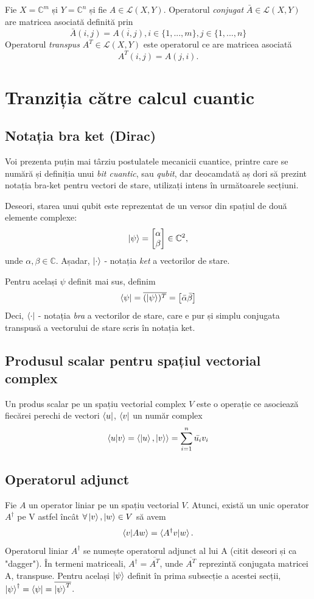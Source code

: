 Fie $X = \mathbb{C}^m$ și $Y = \mathbb{C}^n$ și fie $A \in \mathcal{L}(X,Y)$.
Operatorul \textit{conjugat} $\bar{A} \in \mathcal{L}(X, Y)$ are matricea asociată definită prin
\[
\bar{A}(i,j) = \overline{A(i,j)}, i \in \{1, ..., m\}, j \in \{1, ..., n\}
\]
Operatorul \textit{transpus} $A^T \in \mathcal{L}(X, Y)$ este operatorul ce are matricea asociată
\[
A^T(i,j) = A(j,i).
\]


\section{Tranziția către calcul cuantic}
\subsection{Notația bra ket (Dirac)}

Voi prezenta puțin mai târziu postulatele mecanicii cuantice, printre care se numără și definiția unui \textit{bit cuantic}, sau \textit{qubit}, dar deocamdată aș dori să prezint notația bra-ket pentru vectori de stare, utilizați intens în următoarele secțiuni. 

Deseori, starea unui qubit este reprezentat de un versor din spațiul de două elemente complexe:
\[
\ket{\psi} = \begin{bmatrix} \alpha \\ \beta \end{bmatrix} \in \mathbb{C}^2,
\]
unde $\alpha, \beta \in \mathbb{C}$. Așadar, $\ket{\cdot}$ - notația \textit{ket} a vectorilor de stare.

Pentru același $\psi$ definit mai sus, definim 
\[
\bra{\psi} = \overline{(\ket{\psi})^T} = \begin{bmatrix}
\bar{\alpha} \bar{\beta}
\end{bmatrix}
\]
Deci, $\bra{\cdot}$ - notația \textit{bra} a vectorilor de stare, care e pur și simplu conjugata transpusă a vectorului de stare scris în notația ket.

\subsection{Produsul scalar pentru spațiul vectorial complex}
Un produs scalar pe un spațiu vectorial complex $V$ este o operație ce asociează fiecărei perechi de vectori $\bra{u}$, $\bra{v}$ un număr complex
\[
\braket{u|v} = \braket{\ket{u}, \ket{v}} = \sum_{i=1}^{n} \bar{u_i}v_i
\]

\subsection{Operatorul adjunct}
Fie $A$ un operator liniar pe un spațiu vectorial $V$. Atunci, există un unic operator $A^\dagger$ pe V astfel încât $\forall \ket{v}, \ket{w} \in V$ să avem
\[
    \braket{v|Aw} = \braket{A^\dagger v | w}.
\]
Operatorul liniar $A^\dagger$ se numește operatorul adjunct al lui A (citit deseori și ca "dagger").
În termeni matriceali, $A^\dagger = \overline{A^T}$, unde $\overline{A^T}$ reprezintă conjugata matricei A, transpuse.
Pentru același $\ket{\psi}$ definit în prima subsecție a acestei secții, $\ket{\psi}^\dagger = \bra{\psi} = \overline{\ket{\psi}^T}$.

